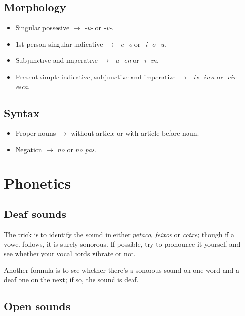 \documentclass{article}
\begin{document}
\subsection*{Morphology}

\begin{itemize}
    \item Singular possesive $\rightarrow$ \emph{-u-} or \emph{-v-}.
    \item 1st person singular indicative $\rightarrow$ \emph{-e -o} or
    \emph{-i -o -u}.
    \item Subjunctive and imperative $\rightarrow$ \emph{-a -en} or
    \emph{-i -in}.
    \item Present simple indicative, subjunctive and imperative $\rightarrow$
    \emph{-ix -isca} or \emph{-eix -esca}.
\end{itemize}

\subsection*{Syntax}

\begin{itemize}
    \item Proper nouns $\rightarrow$ without article or with article before
    noun.
    \item Negation $\rightarrow$ \emph{no} or \emph{no pas}.
\end{itemize}

\section*{Phonetics}

\subsection*{Deaf sounds}

The trick is to identify the sound in either \emph{petaca}, \emph{feixos} or
\emph{cotxe}; though if a vowel follows, it is surely sonorous.
If possible, try to pronounce it yourself and see whether your vocal cords
vibrate or not.

Another formula is to see whether there's a sonorous sound on one word and a
deaf one on the next; if so, the sound is deaf.

\subsection*{Open sounds}
\end{document}
